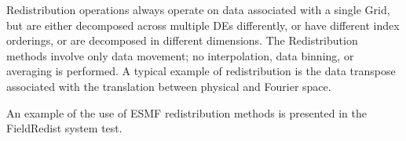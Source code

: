 

Redistribution operations always operate on data associated with a
single Grid, but are either decomposed across multiple DEs
differently, or have different index orderings, or are decomposed
in different dimensions.  The Redistribution methods involve only
data movement; no interpolation, data binning, or averaging is
performed.  A typical example of redistribution is the data transpose
associated with the translation between physical and Fourier space.

An example of the use of ESMF redistribution methods is presented in
the FieldRedist system test.

